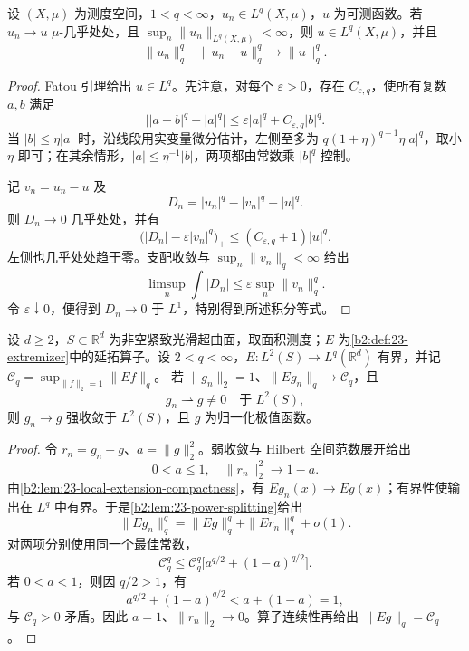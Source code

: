 \begin{lemma}[幂次范数分裂]\label{b2:lem:23-power-splitting}
设 \((X,\mu)\) 为测度空间，\(1<q<\infty\)，\(u_n\in L^q(X,\mu)\)，\(u\) 为可测函数。若 \(u_n\to u\) \(\mu\)-几乎处处，且 \(\sup_n\|u_n\|_{L^q(X,\mu)}<\infty\)，则 \(u\in L^q(X,\mu)\)，并且
\[
 \|u_n\|_q^q-\|u_n-u\|_q^q\longrightarrow\|u\|_q^q.
\]
\end{lemma}
\begin{proof}
Fatou 引理给出 \(u\in L^q\)。先注意，对每个 \(\varepsilon>0\)，存在 \(C_{\varepsilon,q}\)，使所有复数 \(a,b\) 满足
\[
 \bigl||a+b|^q-|a|^q\bigr|
 \leq\varepsilon|a|^q+C_{\varepsilon,q}|b|^q.
\]
当 \(|b|\leq\eta|a|\) 时，沿线段用实变量微分估计，左侧至多为
\(q(1+\eta)^{q-1}\eta|a|^q\)，取小 \(\eta\) 即可；在其余情形，\(|a|\leq\eta^{-1}|b|\)，两项都由常数乘 \(|b|^q\) 控制。

记 \(v_n=u_n-u\) 及
\[
 D_n=|u_n|^q-|v_n|^q-|u|^q.
\]
则 \(D_n\to0\) 几乎处处，并有
\[
 \bigl(|D_n|-\varepsilon|v_n|^q\bigr)_+
 \leq(C_{\varepsilon,q}+1)|u|^q.
\]
左侧也几乎处处趋于零。支配收敛与 \(\sup_n\|v_n\|_q<\infty\) 给出
\[
 \limsup_n\int|D_n|
 \leq\varepsilon\sup_n\|v_n\|_q^q.
\]
令 \(\varepsilon\downarrow0\)，便得到 \(D_n\to0\) 于 \(L^1\)，特别得到所述积分等式。
\end{proof}

\begin{proposition}[非零弱极限恢复全部质量]\label{b2:prop:23-nonzero-profile}
设 \(d\geq2\)，\(S\subset\mathbb R^d\) 为非空紧致光滑超曲面，取面积测度；\(E\) 为\cref{b2:def:23-extremizer}中的延拓算子。设 \(2<q<\infty\)，\(E:L^2(S)\to L^q(\mathbb R^d)\) 有界，并记
\(\mathcal C_q=\sup_{\|f\|_2=1}\|Ef\|_q\)。
若 \(\|g_n\|_2=1\)、\(\|Eg_n\|_q\to\mathcal C_q\)，且
\[
 g_n\rightharpoonup g\neq0\quad\text{于 }L^2(S),
\]
则 \(g_n\to g\) 强收敛于 \(L^2(S)\)，且 \(g\) 为归一化极值函数。
\end{proposition}
\begin{proof}
令 \(r_n=g_n-g\)、\(a=\|g\|_2^2\)。弱收敛与 Hilbert 空间范数展开给出
\[
 0<a\leq1,\quad \|r_n\|_2^2\longrightarrow1-a.
\]
由\cref{b2:lem:23-local-extension-compactness}，有 \(Eg_n(x)\to Eg(x)\)；有界性使输出在 \(L^q\) 中有界。于是\cref{b2:lem:23-power-splitting}给出
\[
 \|Eg_n\|_q^q=\|Eg\|_q^q+\|Er_n\|_q^q+o(1).
\]
对两项分别使用同一个最佳常数，
\[
 \mathcal C_q^q
 \leq\mathcal C_q^q\bigl[a^{q/2}+(1-a)^{q/2}\bigr].
\]
若 \(0<a<1\)，则因 \(q/2>1\)，有
\[
 a^{q/2}+(1-a)^{q/2}<a+(1-a)=1,
\]
与 \(\mathcal C_q>0\) 矛盾。因此 \(a=1\)、\(\|r_n\|_2\to0\)。算子连续性再给出 \(\|Eg\|_q=\mathcal C_q\)。
\end{proof}

